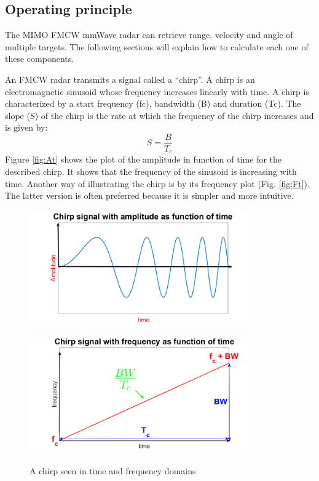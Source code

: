 \subsection{Operating principle}
The \ac{MIMO} \ac{FMCW} \ac{mmWave}  radar can retrieve range, velocity and angle of multiple targets. The following sections will explain how to calculate each one of these components.


An \ac{FMCW} radar transmits a signal called a “chirp”. A chirp is an electromagnetic sinusoid whose frequency  increases linearly with time. A chirp is characterized by a start frequency (fc), bandwidth (B) and duration (Tc). The slope (S) of the chirp is the rate at which the frequency of the chirp increases and is given by:
\begin{equation}
    S=\frac{B}{T_c}
\end{equation}
Figure \ref{fig:At} shows the plot of the amplitude in function of time for the described chirp. It shows that the frequency of the sinusoid is increasing with time. Another way of illustrating the chirp is by its frequency plot (Fig. \ref{fig:Ft}). The latter version is often preferred because it is simpler and more intuitive.

\begin{figure}[ht] 
    \begin{minipage}[b]{.49\linewidth}
        \includegraphics[height=5cm,width=\linewidth]{imgs/chapter2/chirpAt.png}
        \label{fig:At}
    \end{minipage}
    \begin{minipage}[b]{.49\linewidth}
        \includegraphics[height=5cm,width=\linewidth]{imgs/chapter2/chirpFt.png}
        \label{fig:Ft}
    \end{minipage}
    \caption{A chirp seen in time and frequency domains}
    \label{fig:chirp}
\end{figure}

